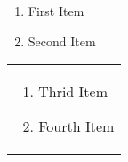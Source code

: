 \documentclass[a4paper,10pt]{article}
\begin{document}
\begin{minipage}{0.45\textwidth}
    \begin{enumerate}
        \item First Item
        \item Second Item
    \end{enumerate}
\end{minipage}
\hfill

\begin{minipage}{0.45\textwidth}
    \begin{tabular}{p{\textwidth}}
        \begin{enumerate}
            \item Thrid Item
            \item Fourth Item
        \end{enumerate}
    \end{tabular}
\end{minipage}
\end{document}
